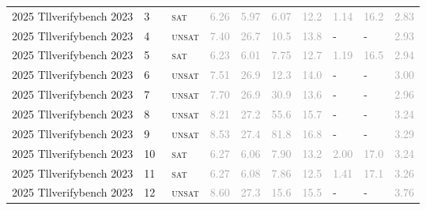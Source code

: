 \begin{center}
{\begin{longtable}{@{}llllllllll@{}}
2025 Tllverifybench 2023 & 3 & ~\textsc{sat} & \textcolor{darkgray}{6.26} & \textcolor{darkgray}{5.97} & \textcolor{darkgray}{6.07} & \textcolor{darkgray}{12.2} & \textcolor{darkgray}{1.14} & \textcolor{darkgray}{16.2} & \textcolor{darkgray}{2.83} \\
2025 Tllverifybench 2023 & 4 & ~\textsc{unsat} & \textcolor{darkgray}{7.40} & \textcolor{darkgray}{26.7} & \textcolor{darkgray}{10.5} & \textcolor{darkgray}{13.8} & - & - & \textcolor{darkgray}{2.93} \\
2025 Tllverifybench 2023 & 5 & ~\textsc{sat} & \textcolor{darkgray}{6.23} & \textcolor{darkgray}{6.01} & \textcolor{darkgray}{7.75} & \textcolor{darkgray}{12.7} & \textcolor{darkgray}{1.19} & \textcolor{darkgray}{16.5} & \textcolor{darkgray}{2.94} \\
2025 Tllverifybench 2023 & 6 & ~\textsc{unsat} & \textcolor{darkgray}{7.51} & \textcolor{darkgray}{26.9} & \textcolor{darkgray}{12.3} & \textcolor{darkgray}{14.0} & - & - & \textcolor{darkgray}{3.00} \\
2025 Tllverifybench 2023 & 7 & ~\textsc{unsat} & \textcolor{darkgray}{7.70} & \textcolor{darkgray}{26.9} & \textcolor{darkgray}{30.9} & \textcolor{darkgray}{13.6} & - & - & \textcolor{darkgray}{2.96} \\
2025 Tllverifybench 2023 & 8 & ~\textsc{unsat} & \textcolor{darkgray}{8.21} & \textcolor{darkgray}{27.2} & \textcolor{darkgray}{55.6} & \textcolor{darkgray}{15.7} & - & - & \textcolor{darkgray}{3.24} \\
2025 Tllverifybench 2023 & 9 & ~\textsc{unsat} & \textcolor{darkgray}{8.53} & \textcolor{darkgray}{27.4} & \textcolor{darkgray}{81.8} & \textcolor{darkgray}{16.8} & - & - & \textcolor{darkgray}{3.29} \\
2025 Tllverifybench 2023 & 10 & ~\textsc{sat} & \textcolor{darkgray}{6.27} & \textcolor{darkgray}{6.06} & \textcolor{darkgray}{7.90} & \textcolor{darkgray}{13.2} & \textcolor{darkgray}{2.00} & \textcolor{darkgray}{17.0} & \textcolor{darkgray}{3.24} \\
2025 Tllverifybench 2023 & 11 & ~\textsc{sat} & \textcolor{darkgray}{6.27} & \textcolor{darkgray}{6.08} & \textcolor{darkgray}{7.86} & \textcolor{darkgray}{12.5} & \textcolor{darkgray}{1.41} & \textcolor{darkgray}{17.1} & \textcolor{darkgray}{3.26} \\
2025 Tllverifybench 2023 & 12 & ~\textsc{unsat} & \textcolor{darkgray}{8.60} & \textcolor{darkgray}{27.3} & \textcolor{darkgray}{15.6} & \textcolor{darkgray}{15.5} & - & - & \textcolor{darkgray}{3.76} \\

\end{longtable}}
\end{center}
